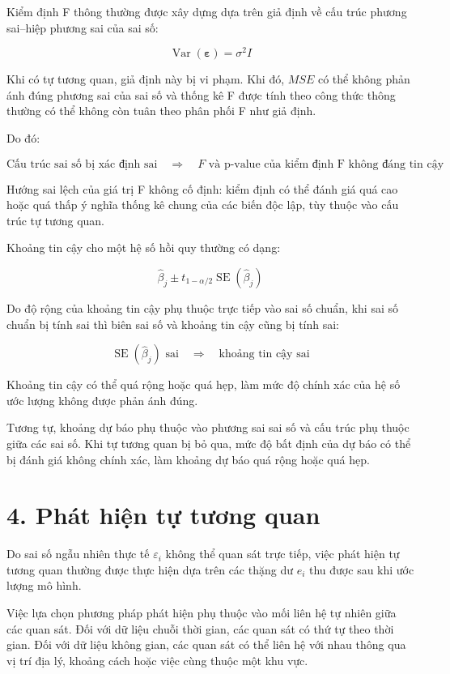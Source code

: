 \documentclass[12pt,a4paper]{article}
\begin{document}
Kiểm định F thông thường được xây dựng dựa trên giả định về cấu trúc phương sai--hiệp phương sai của sai số:

\[
\operatorname{Var}(\boldsymbol{\varepsilon})
=
\sigma^2 I
\]

Khi có tự tương quan, giả định này bị vi phạm. Khi đó, $MSE$ có thể không phản ánh đúng phương sai của sai số và thống kê F được tính theo công thức thông thường có thể không còn tuân theo phân phối F như giả định.

Do đó:

\[
\text{Cấu trúc sai số bị xác định sai}
\quad \Rightarrow \quad
F\text{ và p-value của kiểm định F không đáng tin cậy}
\]

Hướng sai lệch của giá trị F không cố định: kiểm định có thể đánh giá quá cao hoặc quá thấp ý nghĩa thống kê chung của các biến độc lập, tùy thuộc vào cấu trúc tự tương quan.

Khoảng tin cậy cho một hệ số hồi quy thường có dạng:

\[
\hat{\beta}_j
\pm
t_{1-\alpha/2}
\operatorname{SE}(\hat{\beta}_j)
\]

Do độ rộng của khoảng tin cậy phụ thuộc trực tiếp vào sai số chuẩn, khi sai số chuẩn bị tính sai thì biên sai số và khoảng tin cậy cũng bị tính sai:

\[
\operatorname{SE}(\hat{\beta}_j)
\text{ sai}
\quad \Rightarrow \quad
\text{khoảng tin cậy sai}
\]

Khoảng tin cậy có thể quá rộng hoặc quá hẹp, làm mức độ chính xác của hệ số ước lượng không được phản ánh đúng.

Tương tự, khoảng dự báo phụ thuộc vào phương sai sai số và cấu trúc phụ thuộc giữa các sai số. Khi tự tương quan bị bỏ qua, mức độ bất định của dự báo có thể bị đánh giá không chính xác, làm khoảng dự báo quá rộng hoặc quá hẹp.


\section{4. Phát hiện tự tương quan}

Do sai số ngẫu nhiên thực tế $\varepsilon_i$ không thể quan sát trực tiếp, việc phát hiện tự tương quan thường được thực hiện dựa trên các thặng dư $e_i$ thu được sau khi ước lượng mô hình.

Việc lựa chọn phương pháp phát hiện phụ thuộc vào mối liên hệ tự nhiên giữa các quan sát. Đối với dữ liệu chuỗi thời gian, các quan sát có thứ tự theo thời gian. Đối với dữ liệu không gian, các quan sát có thể liên hệ với nhau thông qua vị trí địa lý, khoảng cách hoặc việc cùng thuộc một khu vực.
\end{document}
